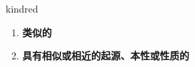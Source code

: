 
\begin{frame}
{\huge kindred}
\begin{center}
\begin{enumerate}\Large
  \item \textbf{类似的}
  \item \textbf{具有相似或相近的起源、本性或性质的}
\end{enumerate}
\end{center}
\end{frame}
